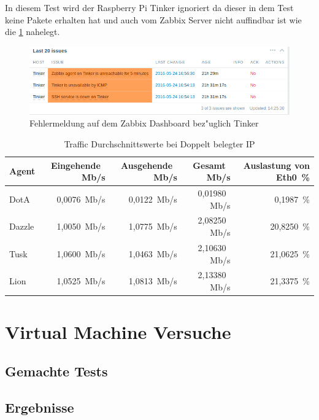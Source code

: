 In diesem Test wird der Raspberry Pi Tinker ignoriert da dieser in dem Test keine Pakete erhalten hat und auch vom %
Zabbix Server nicht auffindbar ist wie die \cref{fig:fehlermeldungenTinker} nahelegt.

\begin{figure}[htbp]
\centering
\includegraphics*[width=0.9\linewidth]{Abb/ZabbixTinker/DoppelteIP/TinkerFaults}

\caption{Fehlermeldung auf dem Zabbix Dashboard bez"uglich Tinker}
\label{fig:fehlermeldungenTinker}
\end{figure}

\begin{table}
\centering
\begin{tabular}{l%
 r<{\,Mb/s}%
 r<{\,Mb/s}%
 r<{\,Mb/s}%
 r<{\,\%}%
}
Agent  	& Eingehende		& Ausgehende		& Gesamt		& Auslastung von Eth0	\\
\hline
DotA	& 0,0076		& 0,0122		& 0,01980		&  0,1987 		\\
Dazzle 	& 1,0050 		& 1,0775		& 2,08250		& 20,8250		\\
Tusk 	& 1,0600		& 1,0463		& 2,10630		& 21,0625		\\
Lion	& 1,0525		& 1,0813		& 2,13380		& 21,3375		\\
\end{tabular}
\caption{Traffic Durchschnittswerte bei Doppelt belegter IP}
\label{tab:DoppelteIPTraffic}
\end{table}


\section{Virtual Machine Versuche}
\label{sec:VMVersuche}
\subsection{Gemachte Tests}
\subsection{Ergebnisse}


